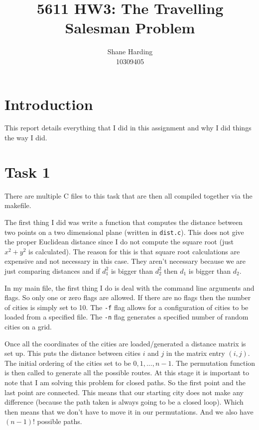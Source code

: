 \documentclass{article}
\begin{document}
\title{5611 HW3: The Travelling Salesman Problem}
\author{Shane Harding \\ 10309405}

\maketitle

\section{Introduction}

This report details everything that I did in this assignment and why I did things the way I did.

\section{Task 1}

There are multiple C files to this task that are then all compiled together via the makefile.

The first thing I did was write a function that computes the distance between two points on a two dimensional plane (written in \verb!dist.c!). This does not give the proper Euclidean distance since I do not compute the square root (just $x^2 + y^2$ is calculated). The reason for this is that square root calculations are expensive and not necessary in this case. They aren't necessary because we are just comparing distances and if $d_1^2$ is bigger than $d_2^2$ then $d_1$ is bigger than $d_2$.

In my main file, the first thing I do is deal with the command line arguments and flags. So only one or zero flags are allowed. If there are no flags then the number of cities is simply set to 10. The \verb!-f! flag allows for a configuration of cities to be loaded from a specified file. The \verb!-n! flag generates a specified number of random cities on a grid.

Once all the coordinates of the cities are loaded/generated a distance matrix is set up. This puts the distance between cities $i$ and $j$ in the matrix entry $(i,j)$. The initial ordering of the cities set to be $0,1,...,n-1$. The permutation function is then called to generate all the possible routes. At this stage it is important to note that I am solving this problem for closed paths. So the first point and the last point are connected. This means that our starting city does not make any difference (because the path taken is always going to be a closed loop). Which then means that we don't have to move it in our permutations. And we also have $(n-1)!$ possible paths.
\end{document}

